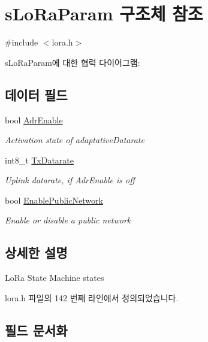\hypertarget{structs_lo_ra_param}{}\section{s\+Lo\+Ra\+Param 구조체 참조}
\label{structs_lo_ra_param}


{\ttfamily \#include $<$lora.\+h$>$}



s\+Lo\+Ra\+Param에 대한 협력 다이어그램\+:
\subsection*{데이터 필드}
\begin{DoxyCompactItemize}
\item 
bool \mbox{\hyperlink{structs_lo_ra_param_a04efa8698eeea64f27b216d64e598c0d}{Adr\+Enable}}
\begin{DoxyCompactList}\small\item\em Activation state of adaptative\+Datarate \end{DoxyCompactList}\item 
int8\+\_\+t \mbox{\hyperlink{structs_lo_ra_param_afc6f53fb662fc66362f998d1351e9c5a}{Tx\+Datarate}}
\begin{DoxyCompactList}\small\item\em Uplink datarate, if Adr\+Enable is off \end{DoxyCompactList}\item 
bool \mbox{\hyperlink{structs_lo_ra_param_aff3bd8c7ac1d2fe36ed22c15c25273aa}{Enable\+Public\+Network}}
\begin{DoxyCompactList}\small\item\em Enable or disable a public network \end{DoxyCompactList}\end{DoxyCompactItemize}


\subsection{상세한 설명}
Lo\+Ra State Machine states 

lora.\+h 파일의 142 번째 라인에서 정의되었습니다.



\subsection{필드 문서화}
\mbox{\label{structs_lo_ra_param_a04efa8698eeea64f27b216d64e598c0d}} 
